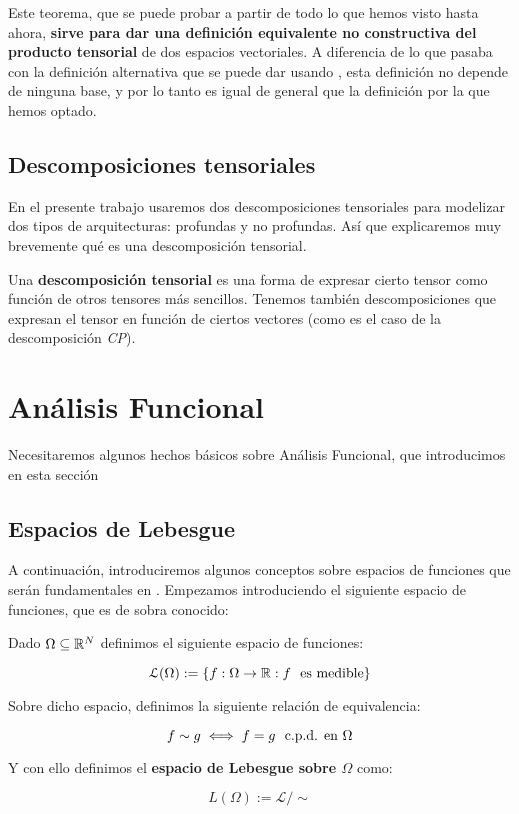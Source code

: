 Este teorema, que se puede probar a partir de todo lo que hemos visto hasta ahora, \textbf{sirve para dar una definición equivalente no constructiva del producto tensorial} de dos espacios vectoriales. A diferencia de lo que pasaba con la definición alternativa que se puede dar usando , esta definición no depende de ninguna base, y por lo tanto es igual de general que la definición por la que hemos optado.

\subsection{Descomposiciones tensoriales}

En el presente trabajo usaremos dos descomposiciones tensoriales para modelizar dos tipos de arquitecturas: profundas y no profundas. Así que explicaremos muy brevemente qué es una descomposición tensorial.

Una \textbf{descomposición tensorial} es una forma de expresar cierto tensor como función de otros tensores más sencillos. Tenemos también descomposiciones que expresan el tensor en función de ciertos vectores (como es el caso de la descomposición \textit{CP}).

\section{Análisis Funcional} \label{sec:preliminares_funcional}

Necesitaremos algunos hechos básicos sobre Análisis Funcional, que introducimos en esta sección

\subsection{Espacios de Lebesgue}

A continuación, introduciremos algunos conceptos sobre espacios de funciones que serán fundamentales en . Empezamos introduciendo el siguiente espacio de funciones, que es de sobra conocido:

\begin{definicion}

    Dado $\Omega \subseteq \mathbb{R}^N$ definimos el siguiente espacio de funciones:

    \begin{equation}
        \mathcal{L}(\Omega) := \{f: \Omega \to \mathbb{R} : f \ \  \text{es medible} \}
    \end{equation}

    Sobre dicho espacio, definimos la siguiente relación de equivalencia:

    \begin{equation}
        f \sim g \iff f = g \ \  \text{c.p.d. en } \Omega
    \end{equation}

    Y con ello definimos el \textbf{espacio de Lebesgue sobre $\Omega$} como:

    \begin{equation}
        L(\Omega) := \mathcal{L} / \sim
    \end{equation}
\end{definicion}

